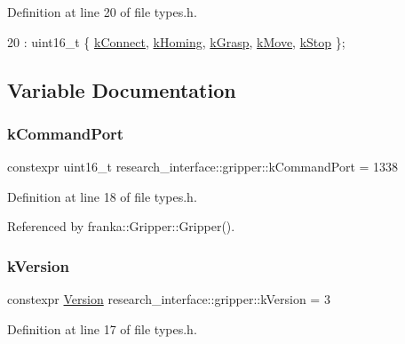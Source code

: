 Definition at line 20 of file types.\+h.


\begin{DoxyCode}
20 : uint16\_t \{ \hyperlink{namespaceresearch__interface_1_1gripper_adeda0327764e059bac8a5f967ce41590a58b5894a4d9f4ad3848df7a9021998d9}{kConnect}, \hyperlink{namespaceresearch__interface_1_1gripper_adeda0327764e059bac8a5f967ce41590a9906cfd5255fe1185f9bf80b01951ef8}{kHoming}, \hyperlink{namespaceresearch__interface_1_1gripper_adeda0327764e059bac8a5f967ce41590a1faf654242c6ff5fa68bb11879664c78}{kGrasp}, \hyperlink{namespaceresearch__interface_1_1gripper_adeda0327764e059bac8a5f967ce41590ae54c7412401b5e36c1c254e6fb17a3dd}{kMove}, \hyperlink{namespaceresearch__interface_1_1gripper_adeda0327764e059bac8a5f967ce41590a97bebae73e3334ef0c946c5df81e440b}{kStop} \};
\end{DoxyCode}


\subsection{Variable Documentation}
\mbox{\label{namespaceresearch__interface_1_1gripper_a15061abce0d0ad8fc0dc04afbfdc71c4}} 
\subsubsection{\texorpdfstring{k\+Command\+Port}{kCommandPort}}
{\footnotesize\ttfamily constexpr uint16\+\_\+t research\+\_\+interface\+::gripper\+::k\+Command\+Port = 1338}



Definition at line 18 of file types.\+h.



Referenced by franka\+::\+Gripper\+::\+Gripper().

\mbox{\label{namespaceresearch__interface_1_1gripper_a9f7080493bb2d8257d1d88e302739c46}} 
\subsubsection{\texorpdfstring{k\+Version}{kVersion}}
{\footnotesize\ttfamily constexpr \hyperlink{namespaceresearch__interface_1_1gripper_a76ede520b2fa3582ac95cd919eceef5b}{Version} research\+\_\+interface\+::gripper\+::k\+Version = 3}



Definition at line 17 of file types.\+h.

